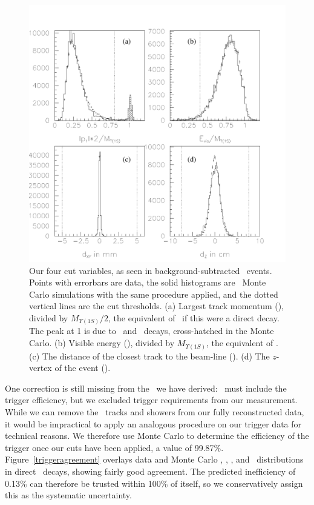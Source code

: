 \documentclass{cornell}
\begin{document}
\begin{figure}[p]
  \begin{center}
    \includegraphics[width=0.9\linewidth]{plots/cascadeagreement}
  \end{center}
  \caption[Test of the Monte Carlo simulation in \us\ recoils from
  \twotoone\ decays]{\label{cascadeagreement} Our four cut variables,
  as seen in background-subtracted \twotoone\ events.  Points with
  errorbars are data, the solid histograms are \twotoone\ Monte Carlo
  simulations with the same procedure applied, and the dotted vertical
  lines are the cut thresholds.  (a) Largest track momentum (\pmax),
  divided by $M_{\Upsilon(1S)}/2$, the equivalent of \ebeam\ if this
  were a direct decay.  The peak at 1 is due to \ee\ and \mumu\
  decays, cross-hatched in the Monte Carlo.  (b) Visible energy
  (\visen), divided by $M_{\Upsilon(1S)}$, the equivalent of \ecm.
  (c) The distance of the closest track to the beam-line (\dxy).  (d)
  The $z$-vertex of the event (\dz).}
\end{figure}

One correction is still missing from the \ecuts\ we have derived:
\ecuts\ must include the trigger efficiency, but we excluded trigger
requirements from our measurement.  While we can remove the \pipi\
tracks and showers from our fully reconstructed data, it would be
impractical to apply an analogous procedure on our trigger data for
technical reasons.  We therefore use Monte Carlo to determine the
efficiency of the trigger once our cuts have been applied, a value of
99.87\%.  Figure~\ref{triggeragreement} overlays data and Monte Carlo
\axial, \stereo, \cblo, and \cbmd\ distributions in direct \us\
decays, showing fairly good agreement.  The predicted inefficiency of
0.13\% can therefore be trusted within 100\% of itself, so we
conservatively assign this as the systematic uncertainty.
\end{document}
